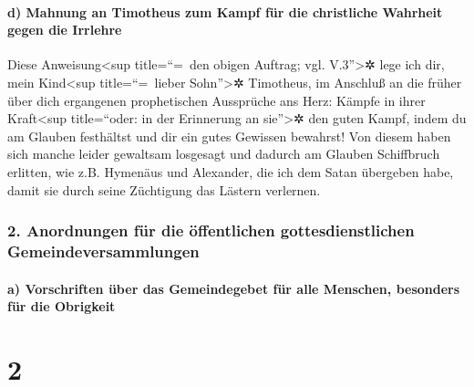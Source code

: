 \hypertarget{d-mahnung-an-timotheus-zum-kampf-fuxfcr-die-christliche-wahrheit-gegen-die-irrlehre}{%
\paragraph{d) Mahnung an Timotheus zum Kampf für die christliche
Wahrheit gegen die
Irrlehre}\label{d-mahnung-an-timotheus-zum-kampf-fuxfcr-die-christliche-wahrheit-gegen-die-irrlehre}}

 Diese Anweisung\textless sup title=``=~den obigen
Auftrag; vgl. V.3''\textgreater✲ lege ich dir, mein Kind\textless sup
title=``=~lieber Sohn''\textgreater✲ Timotheus, im Anschluß an die
früher über dich ergangenen prophetischen Aussprüche ans Herz: Kämpfe in
ihrer Kraft\textless sup title=``oder: in der Erinnerung an
sie''\textgreater✲ den guten Kampf,  indem du am Glauben
festhältst und dir ein gutes Gewissen bewahrst! Von diesem haben sich
manche leider gewaltsam losgesagt und dadurch am Glauben Schiffbruch
erlitten,  wie z.B. Hymenäus und Alexander, die ich dem
Satan übergeben habe, damit sie durch seine Züchtigung das Lästern
verlernen.

\hypertarget{anordnungen-fuxfcr-die-uxf6ffentlichen-gottesdienstlichen-gemeindeversammlungen}{%
\subsubsection{2. Anordnungen für die öffentlichen gottesdienstlichen
Gemeindeversammlungen}\label{anordnungen-fuxfcr-die-uxf6ffentlichen-gottesdienstlichen-gemeindeversammlungen}}

\hypertarget{a-vorschriften-uxfcber-das-gemeindegebet-fuxfcr-alle-menschen-besonders-fuxfcr-die-obrigkeit}{%
\paragraph{a) Vorschriften über das Gemeindegebet für alle Menschen,
besonders für die
Obrigkeit}\label{a-vorschriften-uxfcber-das-gemeindegebet-fuxfcr-alle-menschen-besonders-fuxfcr-die-obrigkeit}}

\hypertarget{section-1}{%
\section{2}\label{section-1}}

